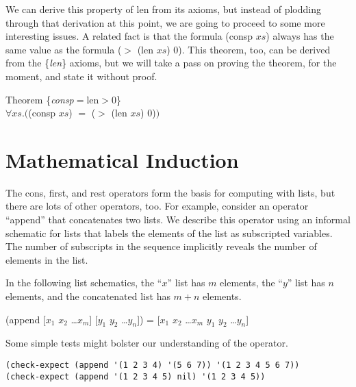 We can derive this property of len from its axioms,
but instead of plodding through that derivation at this point,
we are going to proceed to some more interesting issues.
A related fact is that the formula (consp $xs$) always has the same value
as the formula ($>$ (len $xs$) 0). %
This theorem, too, can be derived from the \{\emph{len}\} axioms,
but we will take a pass on proving the theorem, for the moment,
and state it without proof.
\begin{samepage}
\label{consp-len-thm}
\begin{center}
Theorem \{\emph{consp}$=$len$>$0\} \\
$\forall xs.($(consp $xs$) $=$ ($>$ (len $xs$) 0)$)$
\end{center}
\end{samepage}

\section{Mathematical Induction}
\label{sec:induction}
The cons, first, and rest operators form the basis for computing with lists,
but there are lots of other operators, too.
For example, consider an operator ``append'' that concatenates two lists.
We describe this operator using an informal schematic for lists
that labels the elements of the list as subscripted variables.
The number of subscripts in the sequence implicitly reveals the number of elements in the list.

\label{list-schematic} In the following list schematics, the ``$x$'' list has $m$ elements, the ``$y$'' list has $n$ elements, and the concatenated list has $m+n$ elements.
\begin{samepage}
\begin{center}
(append [$x_1$ $x_2$ \dots $x_m$] [$y_1$ $y_2$ \dots $y_n$]) = [$x_1$ $x_2$ \dots $x_m$ $y_1$ $y_2$ \dots $y_n$]
\end{center}
\end{samepage}

Some simple tests might bolster our understanding of the operator.

\begin{Verbatim}
(check-expect (append '(1 2 3 4) '(5 6 7)) '(1 2 3 4 5 6 7))
(check-expect (append '(1 2 3 4 5) nil) '(1 2 3 4 5))
\end{Verbatim}

